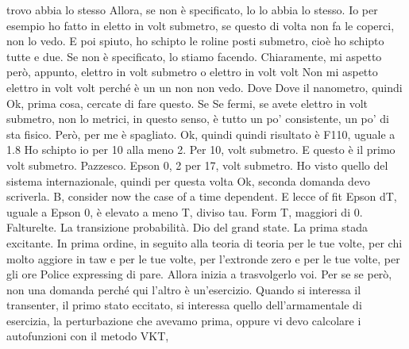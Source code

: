 \begin{soluzione}
trovo abbia lo stesso Allora, se non è specificato, lo lo abbia lo stesso. Io per esempio ho fatto in eletto in volt submetro, se questo di volta non fa le coperci, non lo vedo. E poi spiuto, ho schipto le roline posti submetro, cioè ho schipto tutte e due. Se non è specificato, lo stiamo facendo. Chiaramente, mi aspetto però, appunto, elettro in volt submetro o elettro in volt volt Non mi aspetto elettro in volt volt perché è un un non non vedo. Dove Dove il nanometro, quindi Ok, prima cosa, cercate di fare questo. Se Se fermi, se avete elettro in volt submetro, non lo metrici, in questo senso, è tutto un po' consistente, un po' di sta fisico. Però, per me è spagliato. Ok, quindi quindi risultato è F110, uguale a 1.8 Ho schipto io per 10 alla meno 2. Per 10, volt submetro. E questo è il primo volt submetro. Pazzesco. Epson 0, 2 per 17, volt submetro. Ho visto quello del sistema internazionale, quindi per questa volta Ok, seconda domanda devo scriverla. B, consider now the case of a time dependent. E lecce of fit Epson dT, uguale a Epson 0, è elevato a meno T, diviso tau. Form T, maggiori di 0. Falturelte. La transizione probabilità. Dio del grand state. La prima stada excitante. In prima ordine, in seguito alla teoria di teoria per le tue volte, per chi molto aggiore in taw e per le tue volte, per l'extronde zero e per le tue volte, per gli ore Police expressing di pare. Allora inizia a trasvolgerlo voi. Per se se però, non una domanda perché qui l'altro è un'esercizio. Quando si interessa il transenter, il primo stato eccitato, si interessa quello dell'armamentale di esercizia, la perturbazione che avevamo prima, oppure vi devo calcolare i autofunzioni con il metodo VKT,
   

\end{soluzione}
